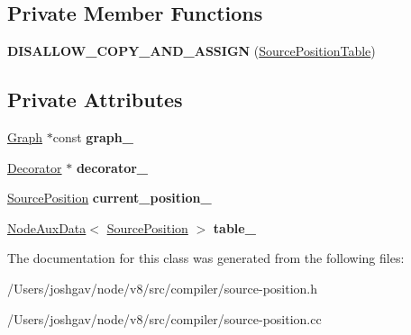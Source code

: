 \subsection*{Private Member Functions}
\begin{DoxyCompactItemize}
\item 
{\bfseries D\+I\+S\+A\+L\+L\+O\+W\+\_\+\+C\+O\+P\+Y\+\_\+\+A\+N\+D\+\_\+\+A\+S\+S\+I\+GN} (\hyperlink{classv8_1_1internal_1_1compiler_1_1_source_position_table}{Source\+Position\+Table})\hypertarget{classv8_1_1internal_1_1compiler_1_1_source_position_table_a3b0621b525092998ee1b89e23482640a}{}\label{classv8_1_1internal_1_1compiler_1_1_source_position_table_a3b0621b525092998ee1b89e23482640a}

\end{DoxyCompactItemize}
\subsection*{Private Attributes}
\begin{DoxyCompactItemize}
\item 
\hyperlink{classv8_1_1internal_1_1compiler_1_1_graph}{Graph} $\ast$const {\bfseries graph\+\_\+}\hypertarget{classv8_1_1internal_1_1compiler_1_1_source_position_table_a62a65d69c9f690eb145f996519f47cfc}{}\label{classv8_1_1internal_1_1compiler_1_1_source_position_table_a62a65d69c9f690eb145f996519f47cfc}

\item 
\hyperlink{classv8_1_1internal_1_1compiler_1_1_source_position_table_1_1_decorator}{Decorator} $\ast$ {\bfseries decorator\+\_\+}\hypertarget{classv8_1_1internal_1_1compiler_1_1_source_position_table_a6c635548505dc4d6f3b9c07347e222dc}{}\label{classv8_1_1internal_1_1compiler_1_1_source_position_table_a6c635548505dc4d6f3b9c07347e222dc}

\item 
\hyperlink{classv8_1_1internal_1_1compiler_1_1_source_position}{Source\+Position} {\bfseries current\+\_\+position\+\_\+}\hypertarget{classv8_1_1internal_1_1compiler_1_1_source_position_table_aae042111fadf0212cb9aa91de08e609d}{}\label{classv8_1_1internal_1_1compiler_1_1_source_position_table_aae042111fadf0212cb9aa91de08e609d}

\item 
\hyperlink{classv8_1_1internal_1_1compiler_1_1_node_aux_data}{Node\+Aux\+Data}$<$ \hyperlink{classv8_1_1internal_1_1compiler_1_1_source_position}{Source\+Position} $>$ {\bfseries table\+\_\+}\hypertarget{classv8_1_1internal_1_1compiler_1_1_source_position_table_aa2bd0791e9cf511d28e232fae189d8b6}{}\label{classv8_1_1internal_1_1compiler_1_1_source_position_table_aa2bd0791e9cf511d28e232fae189d8b6}

\end{DoxyCompactItemize}


The documentation for this class was generated from the following files\+:\begin{DoxyCompactItemize}
\item 
/\+Users/joshgav/node/v8/src/compiler/source-\/position.\+h\item 
/\+Users/joshgav/node/v8/src/compiler/source-\/position.\+cc\end{DoxyCompactItemize}
